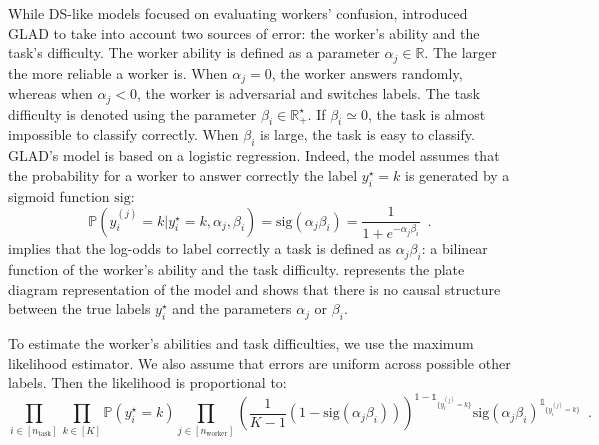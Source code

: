 While DS-like models focused on evaluating workers' confusion, \citet{whitehill_whose_2009} introduced GLAD to take into account two sources of error: the worker's ability and the task's difficulty.
The worker ability is defined as a parameter $\alpha_j\in\mathbb{R}$. The larger the more reliable a worker is.
When $\alpha_j = 0$, the worker answers randomly, whereas when $\alpha_j<0$, the worker is adversarial and switches labels.
The task difficulty is denoted using the parameter $\beta_i\in\mathbb{R}^\star_+$.
If $\beta_i\simeq 0$, the task is almost impossible to classify correctly. When $\beta_i$ is large, the task is easy to classify.
GLAD's model is based on a logistic regression.
Indeed, the model assumes that the probability for a worker to answer correctly the label $y_i^\star=k$ is generated by a sigmoid function $\mathrm{sig}$:
\begin{equation}\label{eq:glad}
    \mathbb{P}(y_i^{(j)}=k |y_i^\star=k, \alpha_j,\beta_i) = \mathrm{sig}(\alpha_j\beta_i) = \frac{1}{1+e^{-\alpha_j\beta_i}} \enspace.
\end{equation}
 implies that the log-odds to label correctly a task is defined as $\alpha_j\beta_i$: a bilinear function of the worker's ability and the task difficulty.  represents the plate diagram representation of the model and shows that there is no causal structure between the true labels $y_i^\star$ and the parameters $\alpha_j$ or $\beta_i$.

To estimate the worker's abilities and task difficulties, we use the maximum likelihood estimator.
We also assume that errors are uniform across possible other labels.
Then the likelihood is proportional to:
\begin{equation}\label{eq:likelihood_glad}
    \prod_{i\in[n_\text{task}]} \prod_{k\in[K]}\mathbb{P}(y_i^\star=k)\prod_{j\in [n_\text{worker}]} \left(\frac{1}{K-1}\left(1-\mathrm{sig}(\alpha_j\beta_i)\right)\right)^{1-\mathds{1}_{\{y_i^{(j)}=k\}}}\mathrm{sig}(\alpha_j\beta_i)^{\mathds{1}_{\{y_i^{(j)}=k\}}} \enspace.
\end{equation}

